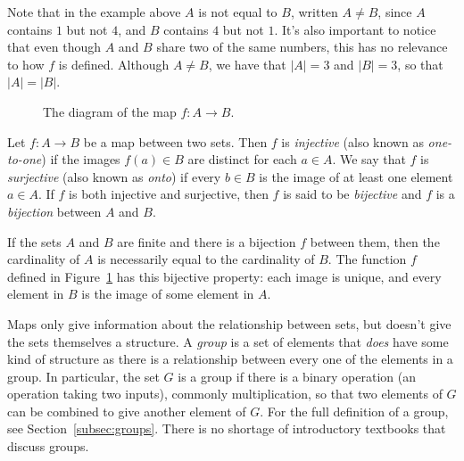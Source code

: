Note that in the example above \(A\) is not equal to \(B\), written \(A \neq B\), since \(A\) contains \(1\) but not \(4\), and \(B\) contains \(4\) but not \(1\). It's also important to notice that even though \(A\) and \(B\) share two of the same numbers, this has no relevance to how \(f\) is defined. Although \(A \neq B\), we have that \(|A| = 3\) and \(|B| = 3\), so that \(|A| = |B|\).

\begin{figure}[h]
    \centering
    \caption{The diagram of the map \(f \colon A \to B\).}
    \label{fig:bijmap}
\end{figure}

\begin{definition}
    Let $f \colon A \to B$ be a map between two sets. Then $f$ is \textit{injective} (also known as \textit{one-to-one}) if the images $f(a) \in B$ are distinct for each $a \in A$. We say that $f$ is \textit{surjective} (also known as \textit{onto}) if every $b \in B$ is the image of at least one element $a \in A$. If $f$ is both injective and surjective, then $f$ is said to be \textit{bijective} and $f$ is a \textit{bijection} between $A$ and $B$.
\end{definition}

If the sets $A$ and $B$ are finite and there is a bijection $f$ between them, then the cardinality of $A$ is necessarily equal to the cardinality  of $B$. The function $f$ defined in Figure~\ref{fig:bijmap} has this bijective property: each image is unique, and every element in $B$ is the image of some element in $A$.

Maps only give information about the relationship between sets, but doesn't give the sets themselves a structure. A \textit{group} is a set of elements that \textit{does} have some kind of structure as there is a relationship between every one of the elements in a group. In particular, the set $G$ is a group if there is a binary operation (an operation taking two inputs), commonly multiplication, so that two elements of $G$ can be combined to give another element of $G$. For the full definition of a group, see Section~\ref{subsec:groups}. There is no shortage of introductory textbooks that discuss groups.

